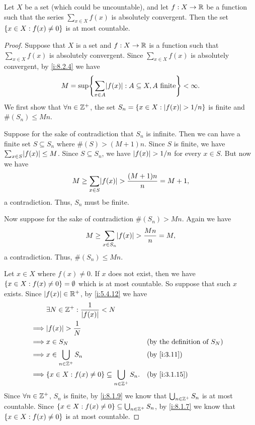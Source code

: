\begin{lem}\label{i:8.2.5}
  Let \(X\) be a set (which could be uncountable), and let \(f : X \to \mathbb{R}\) be a function such that the series \(\sum_{x \in X} f(x)\) is absolutely convergent.
  Then the set \(\left\lbrace x \in X : f(x) \neq 0\right\rbrace\) is at most countable.
\end{lem}

\begin{proof}
  Suppose that \(X\) is a set and \(f : X \to \mathbb{R}\) is a function such that \(\sum_{x \in X} f(x)\) is absolutely convergent.
  Since \(\sum_{x \in X} f(x)\) is absolutely convergent, by \cref{i:8.2.4} we have
  \[
    M = \sup\set{\sum_{x \in A} \abs{f(x)} : A \subseteq X, A \text{ finite}} < \infty.
  \]
  We first show that \(\forall n \in \mathbb{Z}^+\), the set \(S_n = \left\lbrace x \in X : \left\lvert f(x)\right\rvert > 1 / n\right\rbrace\) is finite and \(\#(S_n) \leq Mn\).

  Suppose for the sake of contradiction that \(S_n\) is infinite.
  Then we can have a finite set \(S \subseteq S_n\) where \(\#(S) > (M + 1)n\).
  Since \(S\) is finite, we have \(\sum_{x \in S} \abs{f(x)} \leq M\).
  Since \(S \subseteq S_n\), we have \(\left\lvert f(x)\right\rvert > 1 / n\) for every \(x \in S\).
  But now we have
  \[
    M \geq \sum_{x \in S} \abs{f(x)} > \dfrac{(M + 1)n}{n} = M + 1,
  \]
  a contradiction.
  Thus, \(S_n\) must be finite.

  Now suppose for the sake of contradiction \(\#(S_n) > Mn\).
  Again we have
  \[
    M \geq \sum_{x \in S_n} \abs{f(x)} > \dfrac{Mn}{n} = M,
  \]
  a contradiction.
  Thus, \(\#(S_n) \leq Mn\).

  Let \(x \in X\) where \(f(x) \neq 0\).
  If \(x\) does not exist, then we have \(\left\lbrace x \in X : f(x) \neq 0\right\rbrace = \emptyset\) which is at most countable.
  So suppose that such \(x\) exists.
  Since \(\left\lvert f(x)\right\rvert \in \mathbb{R}^+\), by \cref{i:5.4.12} we have
  \begin{align*}
             & \exists N \in \Z^+ : \dfrac{1}{\abs{f(x)}} < N                                                             \\
    \implies & \abs{f(x)} > \dfrac{1}{N}                                                                                  \\
    \implies & x \in S_N                                                       &  & \text{(by the definition of \(S_N\))} \\
    \implies & x \in \bigcup_{n \in \Z^+} S_n                                  &  & \by{i:3.11}                           \\
    \implies & \set{x \in X : f(x) \neq 0} \subseteq \bigcup_{n \in \Z^+} S_n. &  & \by{i:3.1.15}
  \end{align*}
  Since \(\forall n \in \mathbb{Z}^+\), \(S_n\) is finite, by \cref{i:8.1.9} we know that \(\bigcup_{n \in \mathbb{Z}^+} S_n\) is at most countable.
  Since \(\left\lbrace x \in X : f(x) \neq 0\right\rbrace \subseteq \bigcup_{n \in \mathbb{Z}^+} S_n\), by \cref{i:8.1.7} we know that \(\left\lbrace x \in X : f(x) \neq 0\right\rbrace\) is at most countable.
\end{proof}

